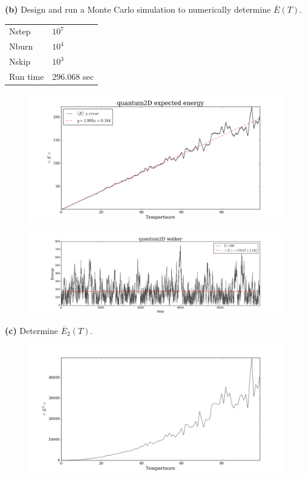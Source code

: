 \documentclass{article}
\begin{document}
\textbf{(b)} Design and run a Monte Carlo simulation to numerically determine $\bar{E}(T)$. \\

\begin{table}[H]
\centering
\begin{tabular}{|l|l|}
	\hline
	Nstep    & $10^7$ \\
	Nburn    & $10^4$ \\
	Nskip    & $10^3$ \\
	Run time &  296.068 sec \\
	\hline
\end{tabular}
\end{table}

\begin{figure}[H]
\begin{center}
\includegraphics[width=16cm]{../output/quantum2D/expected.png} 
\end{center}
\end{figure}

\begin{figure}[H]
\begin{center}
\includegraphics[width=16cm]{../output/quantum2D/walkers.png} 
\end{center}
\end{figure}

\textbf{(c)} Determine $\bar{E}_{2}(T)$. 

\begin{figure}[H]
\begin{center}
\includegraphics[width=16cm]{../output/quantum2D/expected_sq.png} 
\end{center}
\end{figure}
\end{document}
